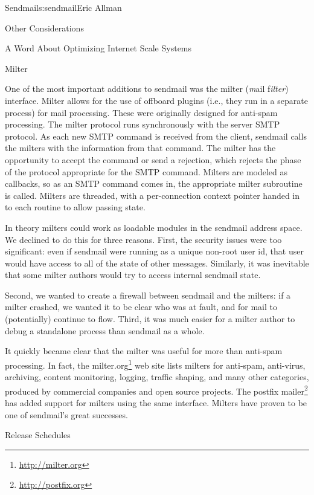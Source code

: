 \begin{aosachapter}{Sendmail}{s:sendmail}{Eric Allman}
\begin{aosasect1}{Other Considerations}
\begin{aosasect2}{A Word About Optimizing Internet Scale Systems}
\end{aosasect2}

\begin{aosasect2}{Milter}

One of the most important additions to sendmail was the milter
(\emph{m}ail f\emph{ilter}) interface.  Milter allows for the use of
offboard plugins (i.e., they run in a separate process) for mail
processing. These were originally designed for anti-spam
processing. The milter protocol runs synchronously with the server
SMTP protocol. As each new SMTP command is received from the client,
sendmail calls the milters with the information from that command. The
milter has the opportunity to accept the command or send a rejection,
which rejects the phase of the protocol appropriate for the SMTP
command. Milters are modeled as callbacks, so as an SMTP command comes
in, the appropriate milter subroutine is called. Milters are threaded,
with a per-connection context pointer handed in to each routine to
allow passing state.

In theory milters could work as loadable modules in the sendmail
address space. We declined to do this for three reasons.  First, the
security issues were too significant: even if sendmail were running as
a unique non-root user id, that user would have access to all of the
state of other messages.  Similarly, it was inevitable that some milter
authors would try to access internal sendmail state.

Second, we wanted to create a firewall between sendmail and the
milters: if a milter crashed, we wanted it to be clear who was at
fault, and for mail to (potentially) continue to flow. Third, it was
much easier for a milter author to debug a standalone process than
sendmail as a whole.

It quickly became clear that the milter was useful for more than
anti-spam processing. In fact, the milter.org\footnote{\url{http://milter.org}}
web site lists milters
for anti-spam, anti-virus, archiving, content monitoring, logging,
traffic shaping, and many other categories, produced by commercial
companies and open source projects. The postfix
mailer\footnote{\url{http://postfix.org}}
has added
support for milters using the same interface. Milters have proven to
be one of sendmail's great successes.

\end{aosasect2}

\begin{aosasect2}{Release Schedules}


\end{aosasect2}
\end{aosasect1}
\end{aosachapter}
